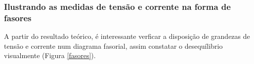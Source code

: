 \documentclass[a4paper,12pt,oneside,openany,table,xcdraw]{article}
\begin{document}
\subsubsection{Ilustrando as medidas de tensão e corrente na forma de fasores}
A partir do resultado teórico, é interessante verficar a disposição de grandezas de tensão e corrente num diagrama fasorial, assim constatar o desequílibrio visualmente (Figura \ref{fasores}).
\vspace{0.15cm}
\begin{figure}[H]
\centering
{}\hfill
{}

\hfill
{}


\end{figure}
\end{document}
